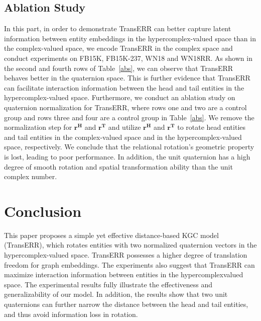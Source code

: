\documentclass[11pt]{article}
\begin{document}
\subsection{Ablation Study}\label{sec6.5}
In this part, in order to demonstrate TransERR can better capture latent information between entity embeddings in the hypercomplex-valued space than in the complex-valued space, we encode TransERR in the complex space and conduct experiments on FB15K, FB15K-237, WN18 and WN18RR. As shown in the second and fourth rows of Table~\ref{abs},  we can observe that TransERR behaves better in the quaternion space. This is further evidence that TransERR can facilitate interaction information between the head and tail entities in the hypercomplex-valued space. Furthermore, we conduct an ablation study on quaternion normalization for TransERR, where rows one and two are a control group and rows three and four are a control group in Table~\ref{abs}. We remove the normalization step for $\mathbf{r^{H}}$ and $\mathbf{r^{T}}$ and utilize  $\mathbf{r^{H}}$ and $\mathbf{r^{T}}$ to rotate head entities and tail entities in the complex-valued space and in the hypercomplex-valued space, respectively. We conclude that the relational rotation's geometric property is lost, leading to poor performance. In addition, the unit quaternion has a high degree of smooth rotation and spatial transformation ability than the unit complex number.




\section{Conclusion}
This paper proposes a simple yet effective distance-based KGC model (TransERR), which rotates entities with two normalized quaternion vectors in the hypercomplex-valued space. TransERR possesses a higher degree of translation freedom for graph embeddings. The experiments also suggest that TransERR can maximize interaction information between entities in the hypercomplexvalued space. The experimental results fully illustrate the effectiveness and generalizability of our model. In addition, the results show that two unit quaternions can further narrow the distance between the head and tail entities, and thus avoid information loss in rotation. 






\appendix
\end{document}
